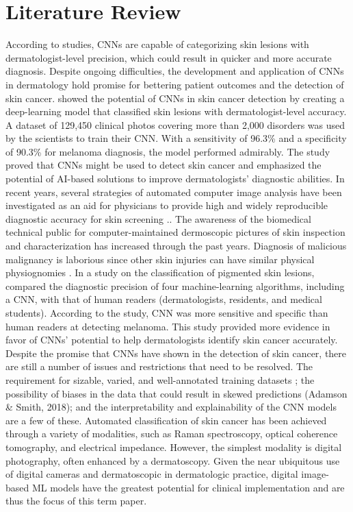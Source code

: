 \documentclass{article}
\begin{document}
\section{Literature Review}
According to studies, CNNs are capable of categorizing skin lesions with dermatologist-level precision, which could result in quicker and more accurate diagnosis. Despite ongoing difficulties, the development and application of CNNs in dermatology hold promise for bettering patient outcomes and the detection of skin cancer.\cite{esteva2017dermatologist} showed the potential of CNNs in skin cancer detection by creating a deep-learning model that classified skin lesions with dermatologist-level accuracy. A dataset of 129,450 clinical photos covering more than 2,000 disorders was used by the scientists to train their CNN. With a sensitivity of 96.3\% and a specificity of 90.3\% for melanoma diagnosis, the model performed admirably. The study proved that CNNs might be used to detect skin cancer and emphasized the potential of AI-based solutions to improve dermatologists' diagnostic abilities.
 In recent years, several strategies of automated computer image analysis have been investigated as an aid for physicians to provide high and widely reproducible diagnostic accuracy for skin screening \cite{haenssle2018man}.. The awareness of the biomedical technical public for computer-maintained dermoscopic pictures of skin inspection and characterization has increased through the past years. Diagnosis of malicious malignancy is laborious since other skin injuries can have similar physical physiognomies \cite{deshpande2016automated}. In a study on the classification of pigmented skin lesions, \cite{tschandl2019comparison} compared the diagnostic precision of four machine-learning algorithms, including a CNN, with that of human readers (dermatologists, residents, and medical students). According to the study, CNN was more sensitive and specific than human readers at detecting melanoma. This study provided more evidence in favor of CNNs' potential to help dermatologists identify skin cancer accurately.
Despite the promise that CNNs have shown in the detection of skin cancer, there are still a number of issues and restrictions that need to be resolved. The requirement for sizable, varied, and well-annotated training datasets \cite{han2018classification}; the possibility of biases in the data that could result in skewed predictions (Adamson \& Smith, 2018); and the interpretability and explainability of the CNN models \cite{holzinger2019causability} are a few of these.
Automated classification of skin cancer has been achieved through a variety of modalities, such as Raman spectroscopy, optical coherence tomography, and electrical impedance. However, the simplest modality is digital photography, often enhanced by a dermatoscopy. Given the near ubiquitous use of digital cameras and dermatoscopic in dermatologic practice, digital image-based ML models have the greatest potential for clinical implementation and are thus the focus of this term paper. 
\end{document}
